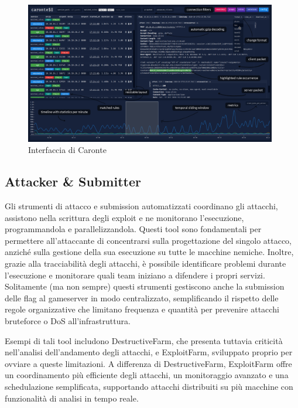 \begin{figure}[H]
    \centering
    \includegraphics[width=0.98\textwidth]{images/chapter1/caronte_interface.png}
    \caption{Interfaccia di Caronte}\label{fig:caronte_interface}
\end{figure}

\subsection{Attacker \& Submitter}

Gli strumenti di attacco e submission automatizzati coordinano gli attacchi, assistono nella scrittura degli exploit e ne monitorano l'esecuzione, programmandola e parallelizzandola. Questi tool sono fondamentali per permettere all’attaccante di concentrarsi sulla progettazione del singolo attacco, anziché sulla gestione della sua esecuzione su tutte le macchine nemiche. Inoltre, grazie alla tracciabilità degli attacchi, è possibile identificare problemi durante l’esecuzione e monitorare quali team iniziano a difendere i propri servizi. Solitamente (ma non sempre) questi strumenti gestiscono anche la submission delle flag al gameserver in modo centralizzato, semplificando il rispetto delle regole organizzative che limitano frequenza e quantità per prevenire attacchi bruteforce o DoS all’infrastruttura.

Esempi di tali tool includono DestructiveFarm, che presenta tuttavia criticità nell’analisi dell’andamento degli attacchi, e ExploitFarm, sviluppato proprio per ovviare a queste limitazioni. A differenza di DestructiveFarm, ExploitFarm offre un coordinamento più efficiente degli attacchi, un monitoraggio avanzato e una schedulazione semplificata, supportando attacchi distribuiti su più macchine con funzionalità di analisi in tempo reale.

